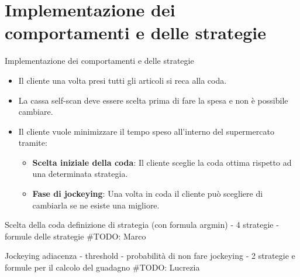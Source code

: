 \section{Implementazione dei comportamenti e delle strategie}





\begin{frame}{Implementazione dei comportamenti e delle strategie}
	\begin{itemize}
		\item Il cliente una volta presi tutti gli articoli si reca alla coda.
		\item La cassa self-scan deve essere scelta prima di fare la spesa e non è possibile cambiare.
		\item Il cliente vuole minimizzare il tempo speso all'interno del supermercato tramite:
		\begin{itemize}
			\item \textbf{Scelta iniziale della coda}: Il cliente sceglie la coda ottima rispetto ad una determinata strategia.
			\item \textbf{Fase di jockeying}: Una volta in coda il cliente può scegliere di cambiarla se ne esiste una migliore.
		\end{itemize}
	\end{itemize}
\end{frame}





\begin{frame}{Scelta della coda}
	\centering
	definizione di strategia (con formula argmin) - 4 strategie - formule delle strategie
	\#TODO: Marco

\end{frame}





\begin{frame}{Jockeying}
	\centering
	adiacenza - threshold - probabilità di non fare jockeying - 2 strategie e formule per il calcolo del guadagno
	\#TODO: Lucrezia
\end{frame}